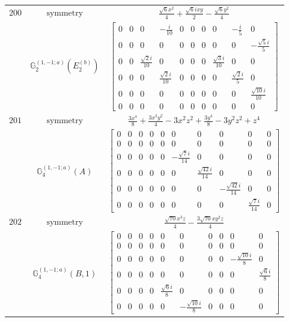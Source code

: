 \documentclass[fleqn,8pt,landscape]{jsarticle}
\begin{document}
\begin{longtable}{ccc}
$ 200 $ & $ \text{symmetry} $ & $ \frac{\sqrt{6} x^{2}}{4} + \frac{\sqrt{6} i x y}{2} - \frac{\sqrt{6} y^{2}}{4} $ \\
$  $ & $ \mathbb{G}_{2}^{(1,-1;a)}(E_{2}^{(b)}) $ & $ \begin{bmatrix} 0 & 0 & 0 & - \frac{i}{10} & 0 & 0 & 0 & 0 & - \frac{i}{5} & 0 \\ 0 & 0 & 0 & 0 & 0 & 0 & 0 & 0 & 0 & - \frac{\sqrt{5} i}{5} \\ 0 & 0 & \frac{\sqrt{2} i}{10} & 0 & 0 & 0 & 0 & \frac{\sqrt{3} i}{10} & 0 & 0 \\ 0 & 0 & 0 & \frac{\sqrt{2} i}{10} & 0 & 0 & 0 & 0 & \frac{\sqrt{2} i}{5} & 0 \\ 0 & 0 & 0 & 0 & 0 & 0 & 0 & 0 & 0 & \frac{\sqrt{10} i}{10} \\ 0 & 0 & 0 & 0 & 0 & 0 & 0 & 0 & 0 & 0 \end{bmatrix} $ \\ \hline
$ 201 $ & $ \text{symmetry} $ & $ \frac{3 x^{4}}{8} + \frac{3 x^{2} y^{2}}{4} - 3 x^{2} z^{2} + \frac{3 y^{4}}{8} - 3 y^{2} z^{2} + z^{4} $ \\
$  $ & $ \mathbb{G}_{4}^{(1,-1;a)}(A) $ & $ \begin{bmatrix} 0 & 0 & 0 & 0 & 0 & 0 & 0 & 0 & 0 & 0 \\ 0 & 0 & 0 & 0 & 0 & 0 & 0 & 0 & 0 & 0 \\ 0 & 0 & 0 & 0 & 0 & - \frac{\sqrt{7} i}{14} & 0 & 0 & 0 & 0 \\ 0 & 0 & 0 & 0 & 0 & 0 & \frac{\sqrt{42} i}{14} & 0 & 0 & 0 \\ 0 & 0 & 0 & 0 & 0 & 0 & 0 & - \frac{\sqrt{42} i}{14} & 0 & 0 \\ 0 & 0 & 0 & 0 & 0 & 0 & 0 & 0 & \frac{\sqrt{7} i}{14} & 0 \end{bmatrix} $ \\ \hline
$ 202 $ & $ \text{symmetry} $ & $ \frac{\sqrt{70} x^{3} z}{4} - \frac{3 \sqrt{70} x y^{2} z}{4} $ \\
$  $ & $ \mathbb{G}_{4}^{(1,-1;a)}(B,1) $ & $ \begin{bmatrix} 0 & 0 & 0 & 0 & 0 & 0 & 0 & 0 & 0 & 0 \\ 0 & 0 & 0 & 0 & 0 & 0 & 0 & 0 & 0 & 0 \\ 0 & 0 & 0 & 0 & 0 & 0 & 0 & 0 & - \frac{\sqrt{10} i}{8} & 0 \\ 0 & 0 & 0 & 0 & 0 & 0 & 0 & 0 & 0 & \frac{\sqrt{6} i}{8} \\ 0 & 0 & 0 & 0 & \frac{\sqrt{6} i}{8} & 0 & 0 & 0 & 0 & 0 \\ 0 & 0 & 0 & 0 & 0 & - \frac{\sqrt{10} i}{8} & 0 & 0 & 0 & 0 \end{bmatrix} $ \\ \hline

\end{longtable}
\end{document}
